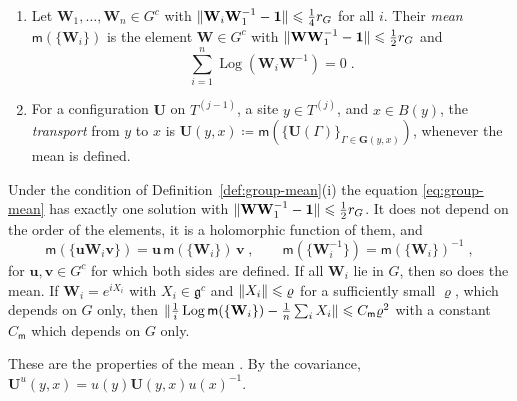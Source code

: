 \documentclass[11pt]{preprint}
\newcommand{\id}{\mathbf 1}
\DeclarePairedDelimiter{\norm}{\lVert}{\rVert}
\numberwithin{equation}{section}
\begin{document}
\begin{definition}\label{def:group-mean}
\begin{enumerate}[label=(\roman*)]
\item Let $\mathbf W_1, \dots, \mathbf W_n \in G^c$ with $\norm{\mathbf W_i\mathbf W_1^{-1} - \id} \leqslant \frac{1}{4}r_G$ for all $i$. Their \emph{mean} $\mathsf m(\{ \mathbf W_i \})$ is the element $\mathbf W \in G^c$ with $\norm{\mathbf W\mathbf W_1^{-1} - \id} \leqslant \frac{1}{2}r_G$ and
\begin{equation}\label{eq:group-mean}
    \sum_{i=1}^{n}\operatorname{Log}(\mathbf W_i\mathbf W^{-1}) = 0\;.
\end{equation}
\item For a configuration $\mathbf U$ on $T^{(j-1)}$, a site $y \in T^{(j)}$, and $x \in B(y)$, the \emph{transport} from $y$ to $x$ is $\mathbf U(y, x) \coloneqq \mathsf m(\{ \mathbf U(\Gamma) \}_{\Gamma \in \mathbf G(y, x)})$, whenever the mean is defined.
\end{enumerate}
\end{definition}

\begin{lemma}\label{lem:group-mean}
Under the condition of Definition~\ref{def:group-mean}(i) the equation \eqref{eq:group-mean} has exactly one solution with $\norm{\mathbf W\mathbf W_1^{-1} - \id} \leqslant \frac{1}{2}r_G$. It does not depend on the order of the elements, it is a holomorphic function of them, and
\[
    \mathsf m(\{ \mathbf u\mathbf W_i\mathbf v \}) = \mathbf u\,\mathsf m(\{ \mathbf W_i \})\,\mathbf v\;,
    \qquad
    \mathsf m(\{ \mathbf W_i^{-1} \}) = \mathsf m(\{ \mathbf W_i \})^{-1}\;,
\]
for $\mathbf u, \mathbf v \in G^c$ for which both sides are defined. If all $\mathbf W_i$ lie in $G$, then so does the mean. If $\mathbf W_i = e^{iX_i}$ with $X_i \in \mathfrak g^c$ and $\norm{X_i} \leqslant \varrho$ for a sufficiently small $\varrho$, which depends on $G$ only, then $\norm{\frac{1}{i}\operatorname{Log}\mathsf m(\{ \mathbf W_i \}) - \frac{1}{n}\sum_iX_i} \leqslant C_{\mathsf m}\varrho^2$ with a constant $C_{\mathsf m}$ which depends on $G$ only.
\end{lemma}

These are the properties \cite[(0.5)--(0.9), p.~253]{BalabanRG1} of the mean \cite[(0.10)]{BalabanRG1}. By the covariance, $\mathbf U^u(y, x) = u(y)\mathbf U(y, x)u(x)^{-1}$.
\end{document}

